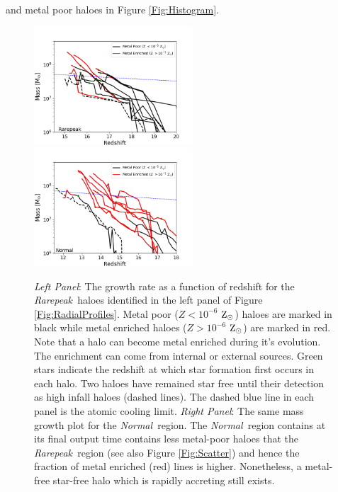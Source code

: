 \documentclass[graphics, twocolumn, usenatbib]{mn2e}
\newcommand{\zsolarc} {$\rm{Z_{\odot}}$}
\newcommand{\rarepeak} {\textit{Rarepeak~}}
\newcommand{\normal} {\textit{Normal~}}
\begin{document}
and metal poor haloes in Figure \ref{Fig:Histogram}.
\begin{figure} 
\centering
\begin{minipage}{175mm}      \begin{center} 
\centerline{
\includegraphics[width=0.525\textwidth]{FIGURES/Rarepeak_MassRedshift.png}
\includegraphics[width=0.525\textwidth]{FIGURES/Normal_MassRedshift.png}}
\caption{\textit{Left Panel}: The growth rate as a function of redshift for the \rarepeak haloes identified in the left
  panel of Figure \ref{Fig:RadialProfiles}. Metal poor ($Z < 10^{-6}$ \zsolarc) haloes are marked in black while
  metal enriched haloes ($Z > 10^{-6}$ \zsolarc) are marked in red. Note that a halo can become metal enriched
  during it's evolution. The enrichment can come from internal or external sources. Green stars indicate the
  redshift at which star formation first occurs in each halo. Two haloes have remained star free until their
  detection as high infall haloes (dashed lines). The dashed blue line in each panel is the atomic cooling limit.
  \textit{Right Panel}: The same mass growth plot for the \normal region. The \normal region contains at its final
  output time contains less metal-poor haloes that the \rarepeak region (see also Figure \ref{Fig:Scatter}) and
  hence the fraction of metal enriched (red) lines is higher. Nonetheless, a metal-free star-free halo which
  is rapidly accreting still exists. 
}\label{Fig:GrowthRates}
\end{center} \end{minipage}

\end{figure}
\end{document}
